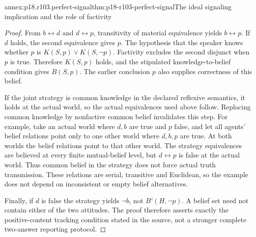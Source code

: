 \begin{annexitem}{annex:p18.r103.perfect-signal}{thm:p18-r103-perfect-signal}{The ideal signaling implication and the role of factivity}
\begin{proof}
From \(b\leftrightarrow d\) and \(d\leftrightarrow p\),
transitivity of material equivalence yields \(b\leftrightarrow p\).
If \(d\) holds, the second equivalence gives \(p\). The hypothesis
that the speaker knows whether \(p\) is
\(K(S,p)\lor K(S,\neg p)\). Factivity excludes the second
disjunct when \(p\) is true. Therefore \(K(S,p)\) holds, and
the stipulated knowledge-to-belief condition gives \(B(S,p)\).
The earlier conclusion \(p\) also supplies correctness of this belief.

If the joint strategy is common knowledge in the declared reflexive
semantics, it holds at the actual world, so the actual equivalences
used above follow. Replacing common knowledge by nonfactive common
belief invalidates this step. For example, take an actual world where
\(d,b\) are true and \(p\) false, and let all agents' belief
relations point only to one other world where \(d,b,p\) are true.
At both worlds the belief relations point to that other world. The
strategy equivalences are believed at every finite mutual-belief level,
but \(d\leftrightarrow p\) is false at the actual world. Thus common
belief in the strategy does not force actual truth transmission.
These relations are serial, transitive and Euclidean, so the example
does not depend on inconsistent or empty belief alternatives.

Finally, if \(d\) is false the strategy yields \(\neg b\), not
\(B'(H,\neg p)\). A belief set need not contain either of the
two attitudes. The proof therefore asserts exactly the positive-content
tracking condition stated in the source, not a stronger complete
two-answer reporting protocol.
\end{proof}
\end{annexitem}
